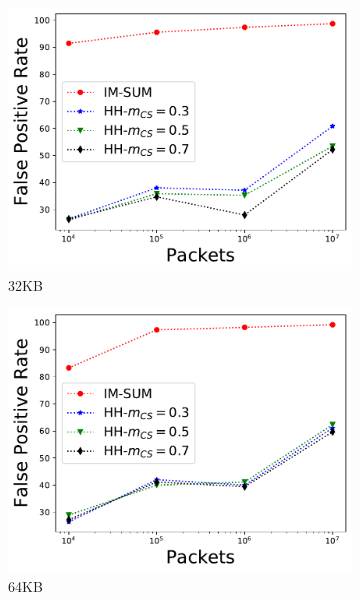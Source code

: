 \begin{figure}
\begin{subfigure}[t]{0.32\textwidth}
    \includegraphics[width=\linewidth]{HH/figures/FPR_per_pkts_m=0.03125.pdf}
    \caption{32KB}
    \label{fig:fig3_a}    
\end{subfigure}\hfill
\begin{subfigure}[t]{0.32\textwidth}
    \includegraphics[width=\linewidth]{HH/figures/FPR_per_pkts_m=0.0625.pdf}
    \caption{64KB}
    \label{fig:fig3_b}
\end{subfigure}\hfill
\begin{subfigure}[t]{0.32\textwidth}

\end{subfigure}
\end{figure}
